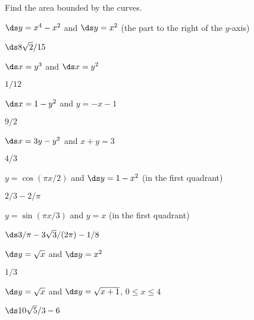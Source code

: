 \begin{exercises}

Find the area bounded by the curves.
\nobreak
\begin{exercise} $\ds y=x^4-x^2$ and $\ds y=x^2$ (the part to the right of the $y$-axis)
\begin{answer} $\ds 8\sqrt2/15$
\end{answer}\end{exercise}

\begin{exercise} $\ds x=y^3$ and $\ds x=y^2$
\begin{answer} $1/12$
\end{answer}\end{exercise}

\begin{exercise} $\ds x=1-y^2$ and $y=-x-1$
\begin{answer} $9/2$
\end{answer}\end{exercise}

\begin{exercise} $\ds x=3y-y^2$ and $x+y=3$
\begin{answer} $4/3$
\end{answer}\end{exercise}

\begin{exercise} $y=\cos(\pi x/2)$ and $\ds y=1- x^2$ (in the first quadrant)
\begin{answer} $2/3-2/\pi$
\end{answer}\end{exercise}

\begin{exercise} $y=\sin(\pi x/3)$ and $y=x$ (in the first quadrant)
\begin{answer} $\ds 3/\pi - 3\sqrt3/(2\pi)-1/8$
\end{answer}\end{exercise}

\begin{exercise} $\ds y=\sqrt{x}$ and $\ds y=x^2$
\begin{answer} $1/3$
\end{answer}\end{exercise}

\begin{exercise} $\ds y=\sqrt x$ and $\ds y=\sqrt{x+1}$, $0\le x\le 4$
\begin{answer} $\ds 10\sqrt{5}/3-6$
\end{answer}\end{exercise}


\end{exercises}
